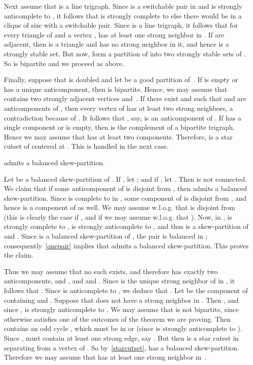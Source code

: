 \documentclass[11 pt] {article}
\newcounter{claim}
\begin{document}
Next assume that  is a line trigraph. Since  is a
switchable pair in  and  is strongly anticomplete to , it follows that  is strongly complete to
 else there would be in  a
clique of size  with a switchable pair. Since  is
a line trigraph, it follows that for every triangle  of  and a
vertex ,  has at least one strong neighbor
in . If  are adjacent, then
 is a triangle and  has no strong neighbor in it, and
hence  is a strongly stable set. But now,
 form a partition of  into
two strongly stable sets of .  So  is bipartite and we proceed as
above.

Finally, suppose that  is doubled and let  be a good
partition of~.  If  is empty or has a unique anticomponent,
then  is bipartite.  Hence, we may assume that  contains two
strongly adjacent vertices  and~.  If there exist  and
 such that  and  are anticomponents
of , then every vertex of  has at least two strong
neighbors, a contradiction because of .  It follows that ,
say, is an anticomponent of .  If  has a single component or
is empty, then  is the complement of a bipartite trigraph.  Hence
we may assume that  has at least two components.  Therefore, 
is a star cutset of  centered at .  This is handled in the next
case.

  admits a balanced skew-partition.

Let  be a balanced skew-partition of . If , let ; and if , let .
Then  is not connected. We claim that if some anticomponent 
of  is disjoint from , then  admits a balanced skew-partition. Since  is complete to  in , some component  of
 is disjoint from , and hence  is a component of
 as well.  We may assume w.l.o.g. that  is disjoint from 
(this is clearly the case if , and if
 we may assume w.l.o.g. that ).  Now, in ,  is strongly complete to ,  is strongly anticomplete to , and thus
 is a skew-partition of  and .  Since  is a
balanced skew-partition of , the pair  is balanced in ;
consequently~\ref{onepair} implies that  admits a balanced skew-partition. This proves the claim.

Thus we may assume that no such  exists, and therefore  has
exactly two anticomponents,  and , and  and . Since  is the unique strong neighbor of  in , it
follows that . Since  is anticomplete to ,
we deduce that . Let  be the component
of  containing  and . Suppose that 
does not have a strong neighbor in .  Then , and since
,  is strongly anticomplete to . We may assume
that  is not bipartite, since otherwise  satisfies one of the
outcomes of the theorem we are proving. Then  contains an odd cycle
, which must be in  or  (since  is strongly
anticomplete to ).  Since ,  must contain at
least one strong edge, say . But then  is a star cutest
in  separating  from a vertex of . So
by~\ref{starcutset},  has a balanced skew-partition. Therefore we
may assume that  has at least one strong neighbor in~.
\end{document}
